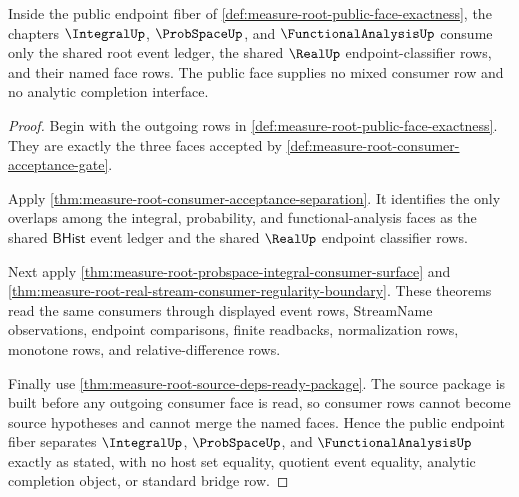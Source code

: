 \begin{theorem}
\label{thm:measure-root-public-face-consumer-separation}
Inside the public endpoint fiber of
\autoref{def:measure-root-public-face-exactness}, the chapters
$\IntegralUp$, $\ProbSpaceUp$, and $\FunctionalAnalysisUp$ consume only the
shared root event ledger, the shared $\RealUp$ endpoint-classifier rows, and
their named face rows. The public face supplies no mixed consumer row and no
analytic completion interface.
\end{theorem}
\begin{proof}
Begin with the outgoing rows in
\autoref{def:measure-root-public-face-exactness}. They are exactly the three
faces accepted by \autoref{def:measure-root-consumer-acceptance-gate}.

Apply \autoref{thm:measure-root-consumer-acceptance-separation}. It identifies
the only overlaps among the integral, probability, and functional-analysis
faces as the shared $\mathsf{BHist}$ event ledger and the shared $\RealUp$
endpoint classifier rows.

Next apply \autoref{thm:measure-root-probspace-integral-consumer-surface} and
\autoref{thm:measure-root-real-stream-consumer-regularity-boundary}. These
theorems read the same consumers through displayed event rows, StreamName
observations, endpoint comparisons, finite readbacks, normalization rows,
monotone rows, and relative-difference rows.

Finally use \autoref{thm:measure-root-source-deps-ready-package}. The source
package is built before any outgoing consumer face is read, so consumer rows
cannot become source hypotheses and cannot merge the named faces. Hence the
public endpoint fiber separates $\IntegralUp$, $\ProbSpaceUp$, and
$\FunctionalAnalysisUp$ exactly as stated, with no host set equality,
quotient event equality, analytic completion object, or standard bridge row.
\end{proof}
